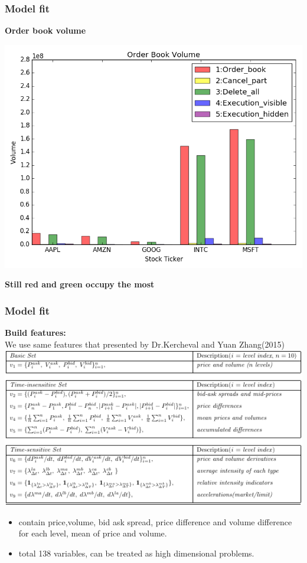 \documentclass[xcolor={x11names,svgnames,dvipsnames}]{beamer}
\begin{document}
\begin{frame}
\frametitle{Model fit}
\textbf{Order book volume}

\begin{center}	
\includegraphics[width=1\textwidth, height=0.7\textheight]{order_book_volume.png}
\end{center}
\textbf{Still red and green occupy the most}
\end{frame}


\begin{frame}
\frametitle{Model fit}
\textbf{Build features:}\\
We use same features that presented by Dr.Kercheval and Yuan Zhang(2015)
	\includegraphics[width=1\textwidth, height=0.6\textheight]{features.png}
\begin{itemize}\footnotesize
			\item contain \alert{price,volume, bid ask spread, price difference and volume difference for each level, mean of price and volume.}  
            \item total 138 variables,  can be treated as high dimensional problems.
\end{itemize}
\end{frame}
\end{document}
